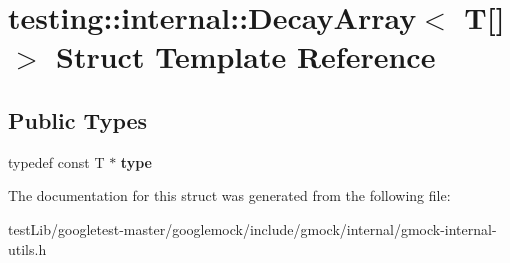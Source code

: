 \hypertarget{structtesting_1_1internal_1_1DecayArray_3_01T[]_4}{}\section{testing\+:\+:internal\+:\+:Decay\+Array$<$ T\mbox{[}\mbox{]}$>$ Struct Template Reference}
\label{structtesting_1_1internal_1_1DecayArray_3_01T[]_4}
\subsection*{Public Types}
\begin{DoxyCompactItemize}
\item 
\mbox{\label{structtesting_1_1internal_1_1DecayArray_3_01T[]_4_a1820b673d104b3a985faaef8db5d77d2}} 
typedef const T $\ast$ {\bfseries type}
\end{DoxyCompactItemize}


The documentation for this struct was generated from the following file\+:\begin{DoxyCompactItemize}
\item 
test\+Lib/googletest-\/master/googlemock/include/gmock/internal/gmock-\/internal-\/utils.\+h\end{DoxyCompactItemize}
